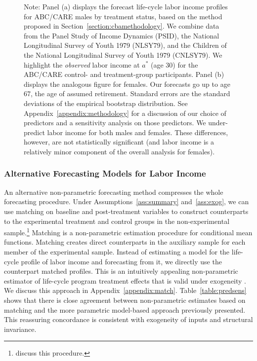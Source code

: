 \begin{figure}
Note: Panel (a) displays the forecast life-cycle labor income profiles for ABC/CARE males by treatment status, based on the method proposed in Section~\ref{section:cbamethodology}. We combine data from the Panel Study of Income Dynamics (PSID), the National Longitudinal Survey of Youth 1979 (NLSY79), and the Children of the National Longitudinal Survey of Youth 1979 (CNLSY79). We highlight the \textit{observed} labor income at $a^*$ (age 30) for the ABC/CARE control- and treatment-group participants. Panel (b) displays the analogous figure for females. Our forecasts go up to age 67, the age of assumed retirement. Standard errors are the standard deviations of the empirical bootstrap distribution. See  Appendix~\ref{appendix:methodology} for a discussion of our choice of predictors and a sensitivity analysis on those predictors. We under-predict labor income for both males and females. These differences, however, are not statistically significant (and labor income is a relatively minor component of the overall analysis for females).
\end{figure}

\subsubsection{Alternative Forecasting Models for Labor Income} \label{section:sens}

\noindent An alternative non-parametric forecasting method compresses the whole forecasting procedure. Under Assumptions~\ref{ass:summary} and~\ref{ass:exog}, we can use matching on baseline and post-treatment variables to construct counterparts to the experimental treatment and control groups in the non-experimental sample.\footnote{\citet{Heckman_Ichimura_etal_1998_Econometrica} discuss this procedure.} Matching is a non-parametric estimation procedure for conditional mean functions. Matching creates direct counterparts in the auxiliary sample for each member of the experimental sample. Instead of estimating a model for the life-cycle profile of labor income and forecasting from it, we directly use the counterpart matched profiles. This is an intuitively appealing non-parametric estimator of life-cycle program treatment effects that is valid under exogeneity \citep{Heckman_Navarro_2004_REStat}. We discuss this approach in Appendix~\ref{appendix:match}. Table~\ref{table:predsens} shows that there is close agreement between non-parametric estimates based on matching and the more parametric model-based approach previously presented. This reassuring concordance is consistent with exogeneity of inputs and structural invariance.

